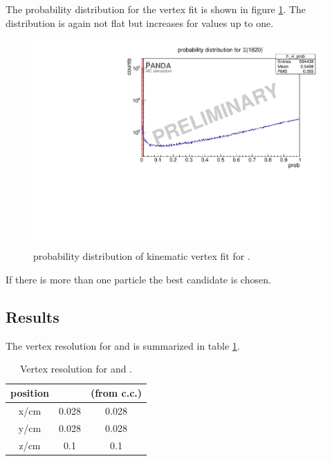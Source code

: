		
		The \chisq probability distribution for the vertex fit is shown in figure \ref{fig:xi1820_prob}.
		The distribution is again not flat but increases for values up to one. 
		
		\begin{figure}
			\centering
			\includegraphics[width=1.\textwidth]{./plots/Xi1820/XiMinus1820_prob.pdf}
			\caption{\propose \chisq probability distribution of kinematic vertex fit for \excitedcascade.}
			\label{fig:xi1820_prob}
		\end{figure}
		
		If there is more than one particle the best candidate is chosen.
		
	\subsection*{Results}
	The vertex resolution for \excitedcascade and \excitedanticascade is summarized in table \ref{tab:Xi1820_vtxres}.
	
	\begin{table}
		\centering
		\caption{\propose Vertex resolution for \excitedcascade and \excitedanticascade.}
		\label{tab:Xi1820_vtxres}
		\begin{tabular}{ccc}
			\hline
			position & \excitedcascade & \excitedanticascade (from c.c.) \\
			\hline
			\hline
			x/cm & 0.028 & 0.028\\
			y/cm & 0.028 & 0.028\\
			z/cm & 0.1 & 0.1\\
			\hline
			 
		\end{tabular}
	\end{table}
	
